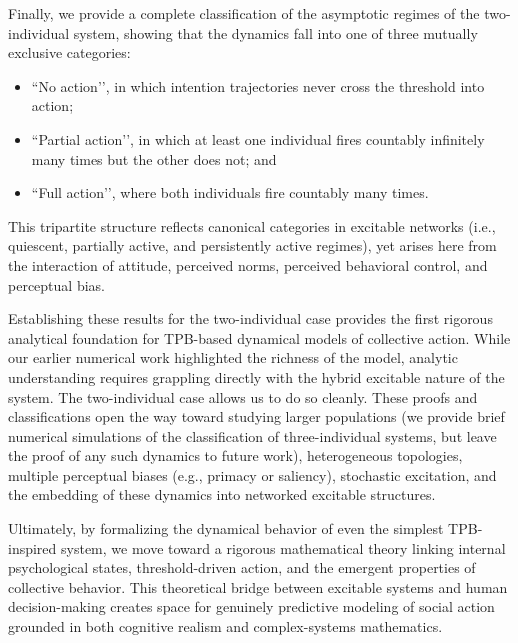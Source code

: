 \documentclass[preprint,12pt]{elsarticle}
\begin{document}
Finally, we provide a complete classification of the asymptotic regimes of the two-individual system, showing that the dynamics fall into one of three mutually exclusive categories:
\begin{itemize}
\item ``No action’’, in which intention trajectories never cross the threshold into action;
\item ``Partial action’’, in which at least one individual fires countably infinitely many times but the other does not;
and
\item``Full action’’, where both individuals fire countably many times.
\end{itemize}
This tripartite structure reflects canonical categories in excitable networks (i.e., quiescent, partially active, and persistently active regimes), yet arises here from the interaction of attitude, perceived norms, perceived behavioral control, and perceptual bias.

Establishing these results for the two-individual case provides the first rigorous analytical foundation for TPB-based dynamical models of collective action. While our earlier numerical work highlighted the richness of the model, analytic understanding requires grappling directly with the hybrid excitable nature of the system. The two-individual case allows us to do so cleanly. These proofs and classifications open the way toward studying larger populations (we provide brief numerical simulations of the classification of three-individual systems, but leave the proof of any such dynamics to future work), heterogeneous topologies, multiple perceptual biases (e.g., primacy or saliency), stochastic excitation, and the embedding of these dynamics into networked excitable structures.

Ultimately, by formalizing the dynamical behavior of even the simplest TPB-inspired system, we move toward a rigorous mathematical theory linking internal psychological states, threshold-driven action, and the emergent properties of collective behavior. This theoretical bridge between excitable systems and human decision-making creates space for genuinely predictive modeling of social action grounded in both cognitive realism and complex-systems mathematics.
\end{document}
